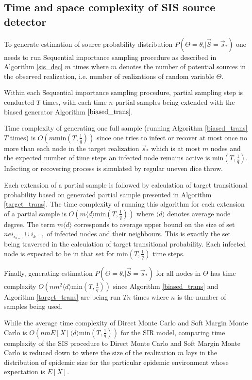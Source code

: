 \documentclass[times, utf8, diplomski]{fer}
\begin{document}
\subsection{Time and space complexity of SIS source detector}

To generate estimation of source probability distribution $P(\Theta = \theta_i | \vec S = \vec s_*)$ one needs to run Sequential importance sampling procedure as described in Algorithm \ref{sis_dec} $m$ times where $m$ denotes the number of potential sources in the observed realization, i.e. number of realizations of random variable $\Theta$.

Within each Sequential importance sampling procedure, partial sampling step is conducted $T$ times, with each time $n$ partial samples being extended with the biased generator Algorithm $\ref{biased_trans}$.

Time complexity of generating one full sample (running Algorithm \ref{biased_trans} $T$ times) is $O(m \text{min}(T, \frac{1}{q}))$ 
since one tries to infect or recover at most once no more than each node in the  target realization $\vec s_*$ which is  at most $m$ nodes and the expected number of time steps an infected node remains active is $\text{min}(T, \frac{1}{q})$. Infecting or recovering process is simulated by regular uneven dice throw. 

Each extension of a partial sample is followed by calculation  of target transitional probability based on generated partial sample presented in Algorithm \ref{target_trans}. The time complexity of running this algorithm  for each extension of a partial sample is $O(m\langle d \rangle \text{min}(T, \frac{1}{q}))$ where $\langle d \rangle$ denotes average node degree. The term $m \langle d \rangle$ corresponds to  average upper bound on the size of set $nei_{i_{k - 1}} \cup i_{k - 1}$ of infected nodes and their neighbours. This is exactly the set being traversed in the calculation of target transitional probability. Each infected node is expected to be in that set for min$(T, \frac{1}{q})$ time steps.

Finally, generating estimation $P(\Theta = \theta_i | \vec S = \vec s_*)$ for all nodes in $\Theta$  has time complexity $O(nm^2\langle d \rangle \text{min}(T, \frac{1}{q}))$ since Algorithm \ref{biased_trans}  and Algorithm \ref{target_trans} are being run $Tn$ times where $n$ is the number of samples being used.

While the average time complexity of Direct Monte Carlo and Soft Margin Monte Carlo is $O(nm E[X]\langle d \rangle \text{min}(T, \frac{1}{q}))$ for the SIR model, comparing time complexity of the SIS procedure to Direct Monte Carlo and Soft Margin Monte Carlo is reduced down to where the size of the realization $m$ lays in the distribution of epidemic size for the particular epidemic environment whose expectation is $E[X]$.
\end{document}
